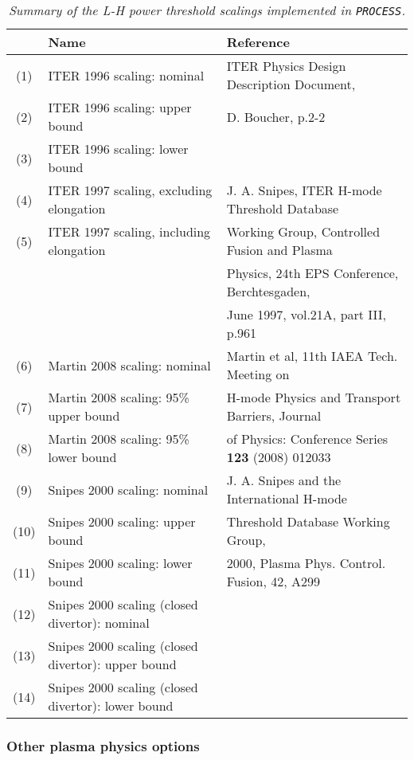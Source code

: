 \documentclass[11pt,a4paper]{report}
\newcommand{\process}{\mbox{\texttt{PROCESS}}}
\begin{document}
\begin{table}[tbph]
\small
\begin{center}
\begin{tabular}{||c||l||l||} \hline
 & Name & Reference \\ \hline
(1) & ITER 1996 scaling: nominal & ITER Physics Design Description Document, \\
(2) & ITER 1996 scaling: upper bound & D. Boucher, p.2-2 \\
(3) & ITER 1996 scaling: lower bound &  \\ \hline
(4) & ITER 1997 scaling, excluding elongation & J. A. Snipes, ITER H-mode
Threshold Database \\
(5) & ITER 1997 scaling, including elongation &  Working Group, Controlled
Fusion and Plasma \\
 & & Physics, 24th EPS Conference, Berchtesgaden, \\
 & & June 1997, vol.21A, part III, p.961 \\ \hline
(6) & Martin 2008 scaling: nominal & Martin et al, 11th IAEA Tech. Meeting on\\
(7) & Martin 2008 scaling: 95\% upper bound &  H-mode Physics and Transport Barriers, Journal \\
(8) & Martin 2008 scaling: 95\% lower bound &  of Physics: Conference Series \textbf{123}
(2008) 012033 \\ \hline
(9) & Snipes 2000 scaling: nominal & J. A. Snipes and the International H-mode\\
(10) & Snipes 2000 scaling: upper bound & Threshold Database Working Group,\\
(11) & Snipes 2000 scaling: lower bound &  2000, Plasma Phys. Control. Fusion, 42, A299\\
(12) & Snipes 2000 scaling (closed divertor): nominal & \\
(13) & Snipes 2000 scaling (closed divertor): upper bound & \\
(14) & Snipes 2000 scaling (closed divertor): lower bound & \\
\hline
\end{tabular}
\end{center}
\normalsize
\caption[List of available L-H power threshold scalings]
{\label{tab:power_thresholds}
  \textit{Summary of the L-H power threshold scalings implemented in \process.}
}
\end{table}

\subsubsection{Other plasma physics options}
\end{document}
